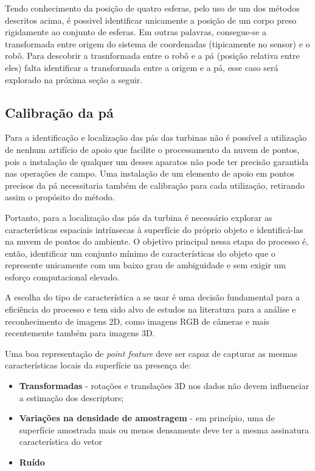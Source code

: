 Tendo conhecimento da posição de quatro esferas, pelo uso de um dos métodos
descritos acima, é possivel identificar unicamente a posição de um corpo preso
rigidamente ao conjunto de esferas. Em outras palavras, consegue-se a
transformada entre origem do sistema de coordenadas (tipicamente no sensor) e o robô. Para descobrir a trasnformada entre o robô e a pá (posição relativa entre eles) falta identificar a
transformada entre a origem e a pá, esse caso será explorado na próxima seção a
seguir.


\subsection{Calibração da pá}

Para a identificação e localização das pás das turbinas não é possível a
utilização de nenhum artifício de apoio que facilite o processamento da nuvem de
pontos, pois a instalação de qualquer um desses aparatos não pode ter precisão
garantida nas operações de campo. Uma instalação de um elemento de apoio em
pontos precisos da pá necessitaria também de calibração para cada utilização, retirando assim
o propósito do método. 

Portanto, para a localização das pás da turbina é
necessário explorar as características espaciais intrínsecas à superfície do
próprio objeto e identificá-las na nuvem de pontos do ambiente. O objetivo
principal nessa etapa do processo é, então, identificar um conjunto mínimo de
características do objeto que o represente unicamente com um baixo grau
de ambiguidade e sem exigir um esforço computacional elevado.

A escolha do tipo de característica a se usar é uma decisão fundamental para a
eficiência do processo e tem sido alvo de estudos na literatura para a análise
e reconhecimento de imagens 2D, como imagens RGB de câmeras e mais recentemente
também para imagens 3D. 

Uma boa representação de \textit{point feature} deve ser capaz de capturar as
mesmas características locais da superfície na presença de:

\begin{itemize}
  \item \textbf{Transformadas} -  rotações e translações 3D nos dados não devem
  influenciar a estimação dos descriptors;
  \item \textbf{Variações na densidade de amostragem} - em princípio, uma de
  superfície amostrada mais ou menos densamente deve ter a mesma assinatura característica do vetor
  \item \textbf{Ruído}
\end{itemize}

